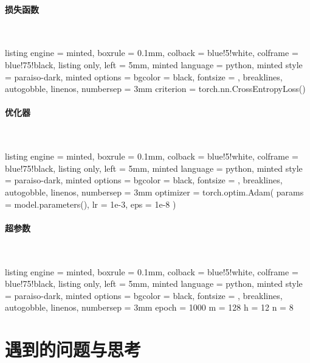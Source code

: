 \documentclass[draft]{article}
\begin{document}
\paragraph*{损失函数}~{}

\begin{tcblisting}{
    listing engine = minted,
    boxrule = 0.1mm,
    colback = blue!5!white,
    colframe = blue!75!black,
    listing only,
    left = 5mm,
    minted language = python,
    minted style = paraiso-dark,
    minted options = {bgcolor = black, fontsize = \small, breaklines, autogobble, linenos, numbersep = 3mm}
}
criterion = torch.nn.CrossEntropyLoss()
\end{tcblisting}

\paragraph*{优化器}~{}

\begin{tcblisting}{
    listing engine = minted,
    boxrule = 0.1mm,
    colback = blue!5!white,
    colframe = blue!75!black,
    listing only,
    left = 5mm,
    minted language = python,
    minted style = paraiso-dark,
    minted options = {bgcolor = black, fontsize = \small, breaklines, autogobble, linenos, numbersep = 3mm}
}
optimizer = torch.optim.Adam(
    params = model.parameters(),
    lr = 1e-3,
    eps = 1e-8
)
\end{tcblisting}

\paragraph*{超参数}~{}

\begin{tcblisting}{
    listing engine = minted,
    boxrule = 0.1mm,
    colback = blue!5!white,
    colframe = blue!75!black,
    listing only,
    left = 5mm,
    minted language = python,
    minted style = paraiso-dark,
    minted options = {bgcolor = black, fontsize = \small, breaklines, autogobble, linenos, numbersep = 3mm}
}
epoch = 1000
m = 128
h = 12
n = 8
\end{tcblisting}




\section{遇到的问题与思考}
\end{document}
